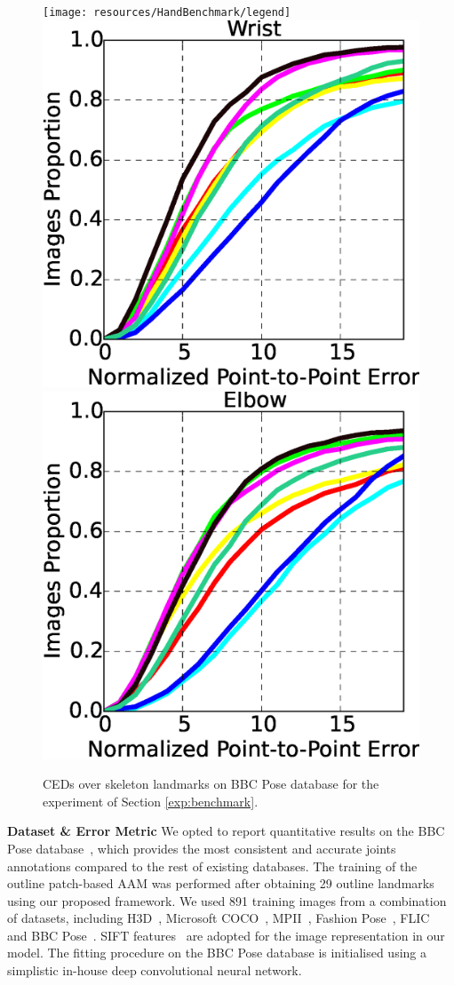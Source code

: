 \begin{figure}[b!]
    \vspace{-5pt}
    \centering
    \texttt{[image: resources/HandBenchmark/legend]}
    \\
    \includegraphics[width=0.48\columnwidth]{resources/HandBenchmark/wrist}
    \includegraphics[width=0.48\columnwidth]{resources/HandBenchmark/elbow}
    \caption{CEDs over skeleton landmarks on BBC Pose database for the experiment of Section  \ref{exp:benchmark}.}
    \label{fig:hand_benchmark}
\end{figure}


\noindent\textbf{Dataset \& Error Metric} We opted to report quantitative results on the BBC Pose database~\cite{pfister2015flowing}, which provides the most consistent and accurate joints annotations compared to the rest of existing databases. The training of the outline patch-based AAM was performed after obtaining 29 outline landmarks using our proposed framework. We used 891 training images from a combination of datasets, including H3D~\cite{PoseletsICCV09}, Microsoft COCO~\cite{lin2014microsoft}, MPII~\cite{andriluka14cvpr}, Fashion Pose~\cite{dantone2013human}, FLIC~\cite{sapp2013modec} and BBC Pose~\cite{pfister2015flowing}. SIFT features~\cite{PoseletsICCV09} are adopted for the image representation in our model. The fitting procedure on the BBC Pose database is initialised using a simplistic in-house deep convolutional neural network.

